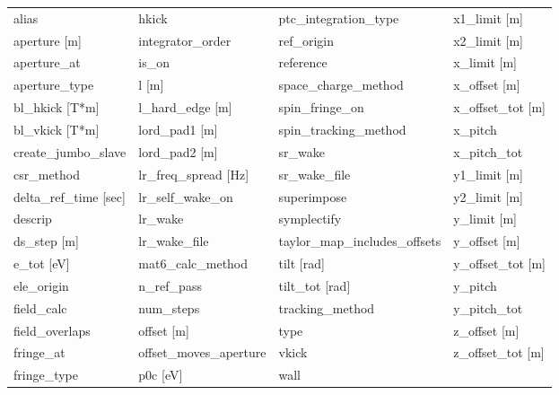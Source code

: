  \begin{tabular}{llll} \toprule
alias                          & hkick                          & ptc_integration_type           & x1_limit [m]                   \\
aperture [m]                   & integrator_order               & ref_origin                     & x2_limit [m]                   \\
aperture_at                    & is_on                          & reference                      & x_limit [m]                    \\
aperture_type                  & l [m]                          & space_charge_method            & x_offset [m]                   \\
bl_hkick [T*m]                 & l_hard_edge [m]                & spin_fringe_on                 & x_offset_tot [m]               \\
bl_vkick [T*m]                 & lord_pad1 [m]                  & spin_tracking_method           & x_pitch                        \\
create_jumbo_slave             & lord_pad2 [m]                  & sr_wake                        & x_pitch_tot                    \\
csr_method                     & lr_freq_spread [Hz]            & sr_wake_file                   & y1_limit [m]                   \\
delta_ref_time [sec]           & lr_self_wake_on                & superimpose                    & y2_limit [m]                   \\
descrip                        & lr_wake                        & symplectify                    & y_limit [m]                    \\
ds_step [m]                    & lr_wake_file                   & taylor_map_includes_offsets    & y_offset [m]                   \\
e_tot [eV]                     & mat6_calc_method               & tilt [rad]                     & y_offset_tot [m]               \\
ele_origin                     & n_ref_pass                     & tilt_tot [rad]                 & y_pitch                        \\
field_calc                     & num_steps                      & tracking_method                & y_pitch_tot                    \\
field_overlaps                 & offset [m]                     & type                           & z_offset [m]                   \\
fringe_at                      & offset_moves_aperture          & vkick                          & z_offset_tot [m]               \\
fringe_type                    & p0c [eV]                       & wall                           &                                \\
 \bottomrule
 \end{tabular}
 \vfill
 
